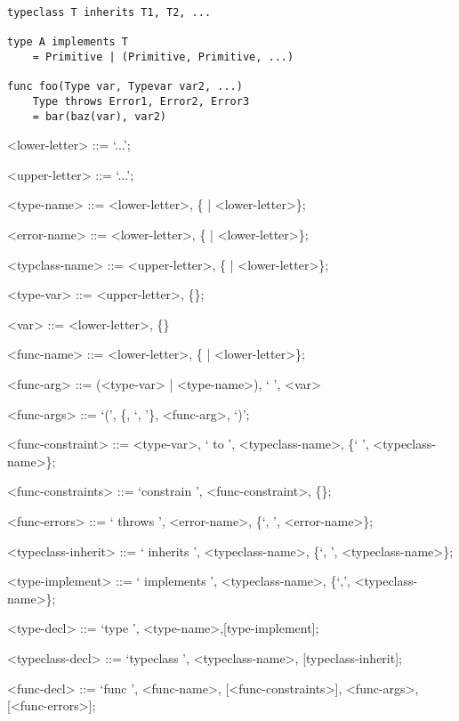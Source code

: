 \documentclass{acm_proc_article-sp}
\begin{document}

\begin{lstlisting}[caption=Grammar displayed informally,style=paratype]
typeclass T inherits T1, T2, ...

type A implements T
    = Primitive | (Primitive, Primitive, ...)

func foo(Type var, Typevar var2, ...)
    Type throws Error1, Error2, Error3
    = bar(baz(var), var2)
\end{lstlisting}

\begin{grammar}
 
<lower-letter> ::= `...';

<upper-letter> ::= `...';

<type-name> ::= <lower-letter>, \{<upper-letter> | <lower-letter>\};

<error-name> ::= <lower-letter>, \{<upper-letter> | <lower-letter>\};

<typclass-name> ::= <upper-letter>, \{<upper-letter> | <lower-letter>\};

<type-var> ::= <upper-letter>, \{<upper-letter>\};

<var> ::= <lower-letter>, \{<lower-letter>\}

<func-name> ::= <lower-letter>, \{<upper-letter> | <lower-letter>\};

<func-arg> ::= (<type-var> | <type-name>), ` ', <var>

<func-args> ::= `(', \{<func-arg>, `, '\}, <func-arg>, `)';

<func-constraint> ::= <type-var>, ` to ', <typeclass-name>, \{` ',
<typeclass-name>\};

<func-constraints> ::= `constrain ', <func-constraint>, \{<func-constraint>\};

<func-errors> ::= ` throws ', <error-name>, \{`, ', <error-name>\};

<typeclass-inherit> ::= ` inherits ', <typeclass-name>, \{`, ', <typeclass-name>\};

<type-implement> ::= ` implements ', <typeclass-name>, \{`,', <typeclass-name>\};

<type-decl> ::= `type ', <type-name>,[type-implement];

<typeclass-decl> ::= `typeclass ', <typeclass-name>, [typeclass-inherit];


<func-decl> ::= `func ', <func-name>, [<func-constraints>], <func-args>, [<func-errors>];

\end{grammar}
\end{document}
